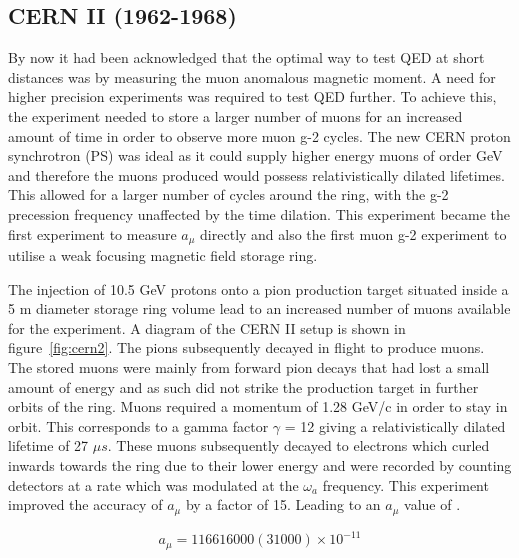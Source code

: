 \subsection{CERN II (1962-1968)}

By now it had been acknowledged that the optimal way to test QED at short distances was by measuring the muon anomalous magnetic moment. A need for higher precision experiments was required to test QED further. To achieve this, the experiment needed to store a larger number of muons for an increased amount of time in order to observe more muon g-2 cycles. The new CERN proton synchrotron (PS) was ideal as it could supply higher energy muons of order GeV and therefore the muons produced would possess relativistically dilated lifetimes. This allowed for a larger number of cycles around the ring, with the g-2 precession frequency unaffected by the time dilation. This experiment became the first experiment to measure $a_{\mu}$ directly and also the first muon g-2 experiment to utilise a weak focusing magnetic field storage ring.

The injection of 10.5 GeV protons onto a pion production target situated inside a 5 m diameter storage ring volume lead to an increased number of muons available for the experiment. A diagram of the CERN II setup is shown in figure~\ref{fig:cern2}. The pions subsequently decayed in flight to produce muons. The stored muons were mainly from forward pion decays that had lost a small amount of energy and as such did not strike the production target in further orbits of the ring.
Muons required a momentum of 1.28 GeV/c in order to stay in orbit. This corresponds to a gamma factor $\gamma$ = 12 giving a relativistically dilated lifetime of 27 $\mu{s}$. These muons subsequently decayed to electrons which curled inwards towards the ring due to their lower energy and were recorded by counting detectors at a rate which was modulated at the $\omega_{a}$ frequency. This experiment improved the accuracy of $a_{\mu}$ by a factor of 15. Leading to an $a_{\mu}$ value of \cite{Reference10}\cite{Reference12}.

\begin{equation}
a_{\mu} = 116616000(31000){\times}10^{-11}
\end{equation}

